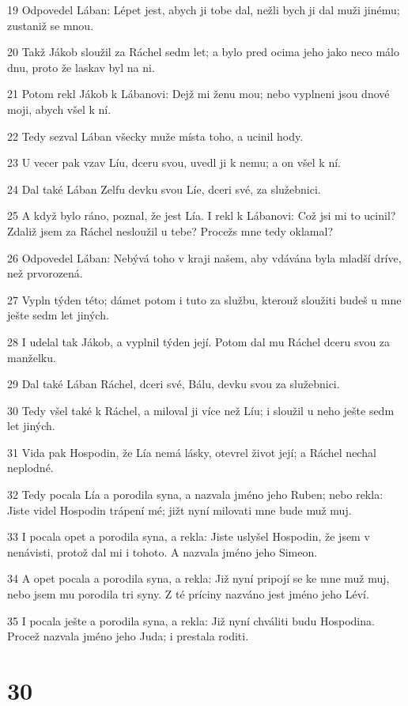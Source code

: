 \par 19 Odpovedel Lában: Lépet jest, abych ji tobe dal, nežli bych ji dal muži jinému; zustaniž se mnou.
\par 20 Takž Jákob sloužil za Ráchel sedm let; a bylo pred ocima jeho jako neco málo dnu, proto že laskav byl na ni.
\par 21 Potom rekl Jákob k Lábanovi: Dejž mi ženu mou; nebo vyplneni jsou dnové moji, abych všel k ní.
\par 22 Tedy sezval Lában všecky muže místa toho, a ucinil hody.
\par 23 U vecer pak vzav Líu, dceru svou, uvedl ji k nemu; a on všel k ní.
\par 24 Dal také Lában Zelfu devku svou Líe, dceri své, za služebnici.
\par 25 A když bylo ráno, poznal, že jest Lía. I rekl k Lábanovi: Což jsi mi to ucinil? Zdaliž jsem za Ráchel nesloužil u tebe? Procežs mne tedy oklamal?
\par 26 Odpovedel Lában: Nebývá toho v kraji našem, aby vdávána byla mladší dríve, než prvorozená.
\par 27 Vypln týden této; dámet potom i tuto za službu, kterouž sloužiti budeš u mne ješte sedm let jiných.
\par 28 I udelal tak Jákob, a vyplnil týden její. Potom dal mu Ráchel dceru svou za manželku.
\par 29 Dal také Lában Ráchel, dceri své, Bálu, devku svou za služebnici.
\par 30 Tedy všel také k Ráchel, a miloval ji více než Líu; i sloužil u neho ješte sedm let jiných.
\par 31 Vida pak Hospodin, že Lía nemá lásky, otevrel život její; a Ráchel nechal neplodné.
\par 32 Tedy pocala Lía a porodila syna, a nazvala jméno jeho Ruben; nebo rekla: Jiste videl Hospodin trápení mé; jižt nyní milovati mne bude muž muj.
\par 33 I pocala opet a porodila syna, a rekla: Jiste uslyšel Hospodin, že jsem v nenávisti, protož dal mi i tohoto. A nazvala jméno jeho Simeon.
\par 34 A opet pocala a porodila syna, a rekla: Již nyní pripojí se ke mne muž muj, nebo jsem mu porodila tri syny. Z té príciny nazváno jest jméno jeho Léví.
\par 35 I pocala ješte a porodila syna, a rekla: Již nyní chváliti budu Hospodina. Procež nazvala jméno jeho Juda; i prestala roditi.

\chapter{30}


